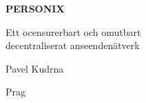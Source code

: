 \thispagestyle{empty}
\begin{center}
  {\sffamily\bfseries\fontsize{34}{40}\selectfont PERSONIX\par}
  \vspace{2.2em}
  {\rmfamily\large Ett ocensurerbart och omutbart\\[0.25em]
   decentraliserat anseendenätverk\par}
\end{center}
\begin{center}
  {\rmfamily\Large Pavel Kudrna\par}
  \vspace{0.45em}
  {\rmfamily\small Prag\quad\textbullet{}\par}
\end{center}
\clearpage
